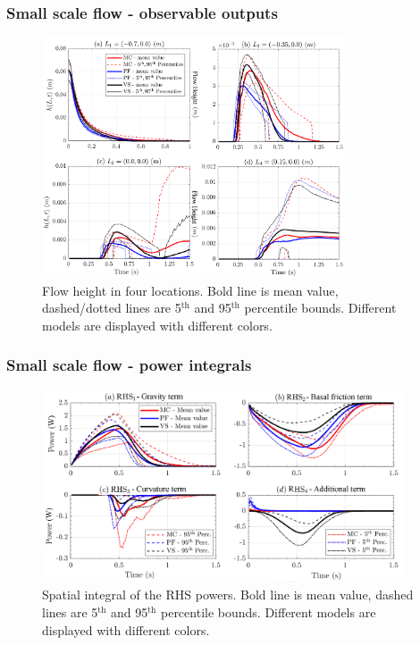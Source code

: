 \documentclass{beamer}
\begin{document}
\begin{frame}
\frametitle{Small scale flow - \small{observable outputs}}
\begin{figure}
\includegraphics[width=0.80\textwidth]{figures/incline/Height.png}
        \caption{Flow height in four locations. Bold line is mean value, dashed/dotted lines are 5$^{\mathrm{th}}$ and 95$^{\mathrm{th}}$ percentile bounds. Different models are displayed with different colors.}
\end{figure}
\end{frame}

\begin{frame}
\frametitle{Small scale flow - \small{power integrals}}
\begin{figure}
\includegraphics[width=0.95\textwidth]{figures/incline/PowersIncline.png}
        \caption{Spatial integral of the RHS powers. Bold line is mean value, dashed lines are 5$^{\mathrm{th}}$ and 95$^{\mathrm{th}}$ percentile bounds. Different models are displayed with different colors.}
\end{figure}
\end{frame}
\end{document}
